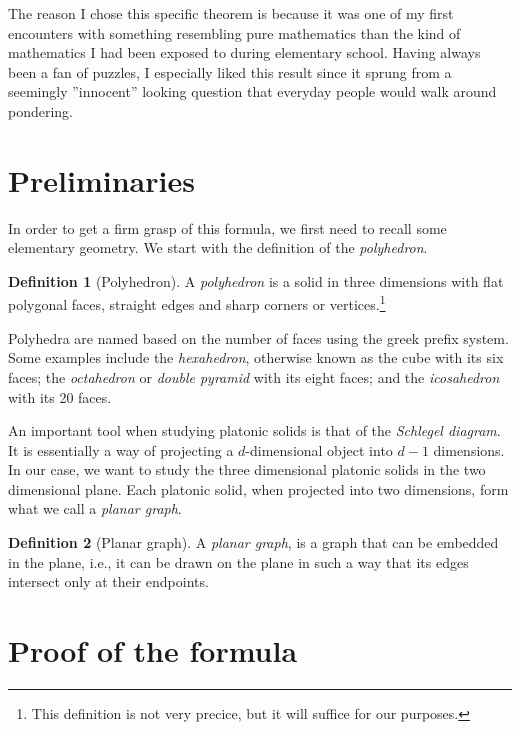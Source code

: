 \documentclass{amsart}
\theoremstyle{plain}
\theoremstyle{definition}
\newtheorem{definition}{Definition}
\begin{document}
The reason I chose this specific theorem is because it was one of my first
encounters with something resembling pure mathematics than the kind of
mathematics I had been exposed to during elementary school. Having always been
a fan of puzzles, I especially liked this result since it sprung from a
seemingly ''innocent'' looking question that everyday people would walk around
pondering.
 
\section{Preliminaries}
\label{sec:preliminaries}

In order to get a firm grasp of this formula, we first need to recall some
elementary geometry.  We start with the definition of the \emph{polyhedron}.

\begin{definition}[Polyhedron]
    A \emph{polyhedron} is a solid in three dimensions with flat polygonal
    faces, straight edges and sharp corners or vertices.\footnote{This
    definition is not very precice, but it will suffice for our purposes.}
\end{definition}

Polyhedra are named based on the number of faces using the greek prefix system.
Some examples include the \emph{hexahedron}, otherwise known as the cube with
its six faces; the \emph{octahedron} or \emph{double pyramid} with its eight
faces; and the \emph{icosahedron} with its 20 faces.

An important tool when studying platonic solids is that of the \emph{Schlegel
diagram}. It is essentially a way of projecting a $d$-dimensional object into
$d-1$ dimensions. In our case, we want to study the three dimensional platonic
solids in the two dimensional plane. Each platonic solid, when projected into
two dimensions, form what we call a \emph{planar graph}.

\begin{definition}[Planar graph]
  A \emph{planar graph}, is a graph that can be embedded in the plane, i.e., it
  can be drawn on the plane in such a way that its edges intersect only at
  their endpoints.
\end{definition}

\section{Proof of the formula}
\label{sec:proof_of_the_formula}
\end{document}
